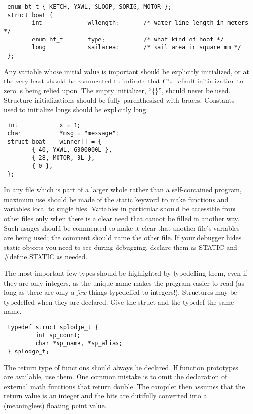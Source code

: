 \begin{verbatim}
 enum bt_t { KETCH, YAWL, SLOOP, SQRIG, MOTOR };
 struct boat {
        int             wllength;       /* water line length in meters */
        enum bt_t       type;           /* what kind of boat */
        long            sailarea;       /* sail area in square mm */
 };
\end{verbatim}

 Any variable whose initial value is important should be explicitly
initialized, or at the very least should be commented to indicate that C's
default initialization to zero is being relied upon. The empty initializer,
``\{\}'', should never be used. Structure initializations should be fully
parenthesized with braces. Constants used to initialize longs should be
explicitly long. 

\begin{verbatim}
 int            x = 1;
 char           *msg = "message";
 struct boat    winner[] = {
        { 40, YAWL, 6000000L },
        { 28, MOTOR, 0L },
        { 0 },
 }; 
\end{verbatim}

 In any file which is part of a larger whole rather than a self-contained
program, maximum use should be made of the static keyword to make functions and
variables local to single files.
Variables in particular should be accessible from other files only when there
is a clear need that cannot be filled in another way. Such usages should be
commented to make it clear that another file's variables are being used; the
comment should name the other file. If your debugger hides static objects you
need to see during debugging, declare them as STATIC and \#define STATIC as
needed. 

 The most important few types should be highlighted by typedeffing them, even
if they are only integers, as the unique name makes the program easier to read
(as long as there are only a {\em few} things typedeffed to integers!).
Structures may be typedeffed when they are declared. Give the struct and
the typedef the same name. 

\begin{verbatim}
 typedef struct splodge_t {
         int sp_count;
         char *sp_name, *sp_alias;
 } splodge_t; 
\end{verbatim}

 The return type of functions should always be declared. If function prototypes
are available, use them. One common mistake is to omit the declaration of
external math functions that return double. The compiler then assumes that the
return value is an integer and the bits are dutifully converted into a
(meaningless) floating point value. 

